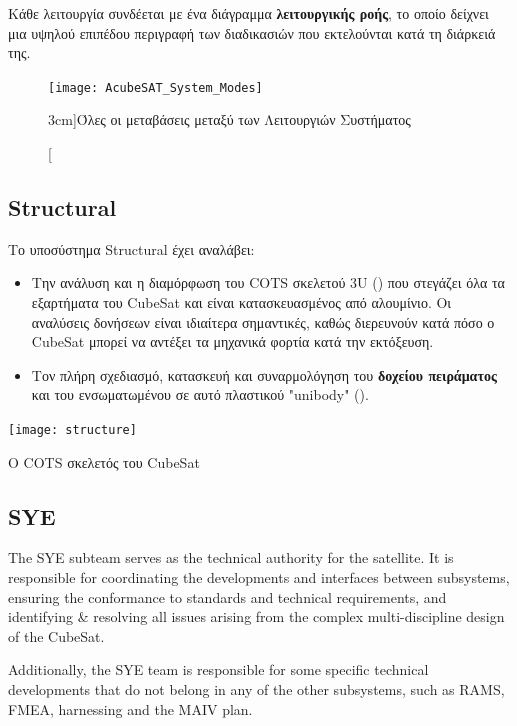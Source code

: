 \documentclass[a4paper,nobib]{tufte-book}
\begin{document}
Κάθε λειτουργία συνδέεται με ένα διάγραμμα \textbf{λειτουργικής ροής}, το οποίο δείχνει μια υψηλού επιπέδου περιγραφή των διαδικασιών που εκτελούνται κατά τη διάρκειά της.\autocite{acubesat_functional_2021}

\begin{figure}
	\centering
	\texttt{[image: AcubeSAT\_System\_Modes]}
	\caption[][3cm]{Όλες οι μεταβάσεις μεταξύ των Λειτουργιών Συστήματος}
	\label{fig:transitions}
\end{figure}


\subsection{Structural}

Το υποσύστημα Structural έχει αναλάβει:
\begin{itemize}
	\item Την ανάλυση και η διαμόρφωση του \ac{COTS} σκελετού 3U () που στεγάζει όλα τα εξαρτήματα του CubeSat και είναι κατασκευασμένος από αλουμίνιο. Οι αναλύσεις δονήσεων είναι ιδιαίτερα σημαντικές, καθώς διερευνούν κατά πόσο ο CubeSat μπορεί να αντέξει τα μηχανικά φορτία κατά την εκτόξευση.
	\item Τον πλήρη σχεδιασμό, κατασκευή και συναρμολόγηση του \textbf{δοχείου πειράματος} και του ενσωματωμένου σε αυτό πλαστικού "unibody" ().
\end{itemize}

\begin{marginfigure}
	\centering
	\texttt{[image: structure]}
	\caption{Ο \acs{COTS} σκελετός του CubeSat}
	\label{fig:structure}
\end{marginfigure}

\subsection{\acf{SYE}}

The \acl{SYE} subteam serves as the technical authority for the satellite. It is responsible for coordinating the developments and interfaces between subsystems, ensuring the conformance to standards and technical requirements, and identifying \& resolving all issues arising from the complex multi-discipline design of the CubeSat.

Additionally, the \ac{SYE} team is responsible for some specific technical developments that do not belong in any of the other subsystems, such as \ac{RAMS}, \ac{FMEA}, harnessing and the \acl{MAIV} plan.
\end{document}
